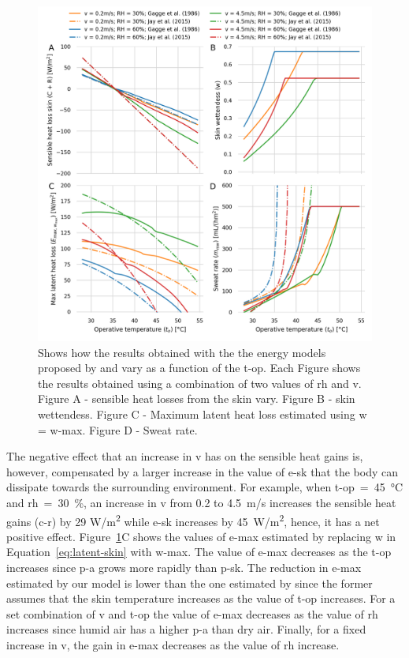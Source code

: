 \begin{figure}[b!]
    \centering
    \includegraphics[width=\textwidth]{figures/comparison_models_v2.png}
    \caption{Shows how the results obtained with the the energy models proposed by  and  vary as a function of the \ac{t-op}.
    Each Figure shows the results obtained using a combination of two values of \ac{rh} and \ac{v}.
    Figure A - sensible heat losses from the skin vary.
    Figure B - skin wettendess.
    Figure C - Maximum latent heat loss estimated using \ac{w} = \ac{w-max}.
    Figure D - Sweat rate.}
    \label{fig:comparison_models}
\end{figure}

The negative effect that an increase in \ac{v} has on the sensible heat gains is, however, compensated by a larger increase in the value of \ac{e-sk} that the body can dissipate towards the surrounding environment.
For example, when \ac{t-op}~=~45~°C and \ac{rh}~=~30~\%, an increase in \ac{v} from 0.2 to 4.5~m/s increases the sensible heat gains (\acs{c-r}) by 29 W/m\textsuperscript{2} while \ac{e-sk} increases by 45~W/m\textsuperscript{2}, hence, it has a net positive effect.
Figure~\ref{fig:comparison_models}C shows the values of \ac{e-max} estimated by replacing \ac{w} in Equation~\ref{eq:latent-skin} with \ac{w-max}.
The value of \ac{e-max} decreases as the \ac{t-op} increases since \ac{p-a} grows more rapidly than \ac{p-sk}.
The reduction in \ac{e-max} estimated by our model is lower than the one estimated by  since the former assumes that the skin temperature increases as the value of \ac{t-op} increases.
For a set combination of \ac{v} and \ac{t-op} the value of \ac{e-max} decreases as the value of \ac{rh} increases since humid air has a higher \ac{p-a} than dry air.
Finally, for a fixed increase in \ac{v}, the gain in \ac{e-max} decreases as the value of \ac{rh} increase.

